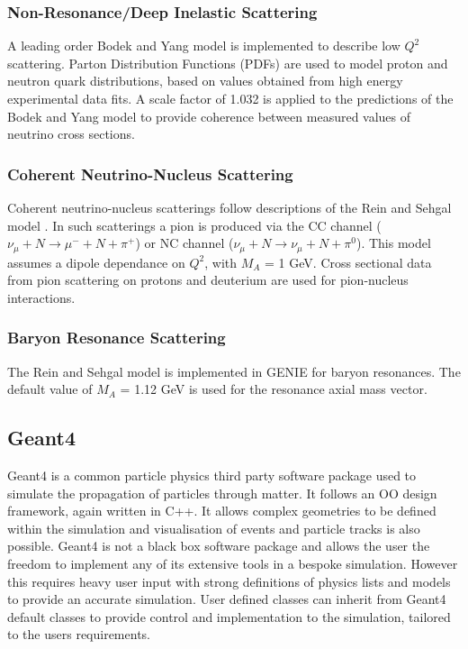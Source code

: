 \subsubsection{Non-Resonance/Deep Inelastic Scattering}
A leading order Bodek and Yang model \cite{bodekYangModel} is implemented to describe low $Q^{2}$ scattering. Parton Distribution Functions (PDFs) are used to model proton and neutron quark distributions, based on values obtained from high energy experimental data fits. A scale factor of 1.032 is applied to the predictions of the Bodek and Yang model to provide coherence between measured values of neutrino cross sections. 

\subsubsection{Coherent Neutrino-Nucleus Scattering}
Coherent neutrino-nucleus scatterings follow descriptions of the Rein and Sehgal model \cite{reinSehgalModel}. In such scatterings a pion is produced via the CC channel ($\nu_{\mu} + N \rightarrow \mu^{-} + N + \pi^{+}$) or NC channel ($\nu_{\mu} + N \rightarrow \nu_{\mu} + N + \pi^{0}$). This model assumes a dipole dependance on $Q^{2}$, with $M_{A}$ = 1 GeV. Cross sectional data from pion scattering on protons and deuterium are used for pion-nucleus interactions.

\subsubsection{Baryon Resonance Scattering}
The Rein and Sehgal model\cite{reinSehgalModel2} is implemented in GENIE for baryon resonances. The default value of $M_{A}$ = 1.12 GeV is used for the resonance axial mass vector.

\subsection{Geant4}
Geant4 \cite{GEANT} is a common particle physics third party software package used to simulate the propagation of particles through matter. It follows an OO design framework, again written in C++.
It allows complex geometries to be defined within the simulation and visualisation of events and particle tracks is also possible. Geant4 is not a black box software package and allows the user the freedom to implement any of its extensive tools in a bespoke simulation. However this requires heavy user input with strong definitions of physics lists and models to provide an accurate simulation. User defined classes can inherit from Geant4 default classes to provide control and implementation to the simulation, tailored to the users requirements. 

